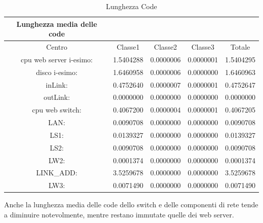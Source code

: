 \begin{table}[htbp]
\begin{center}
\begin{tabular}{|c|c|c|c|c|}
\hline
Lunghezza media delle code\\
\hline
Centro &Classe1 &Classe2 &Classe3 &Totale\\
\hline
\hline
 cpu web server i-esimo: 	&1.5404288	&0.0000006	&0.0000001	&1.5404295\\
\hline
 disco i-esimo: 	&1.6460958	&0.0000006	&0.0000000	&1.6460963\\
\hline
 inLink: 	&0.4752640	&0.0000007	&0.0000001	&0.4752647\\
\hline
 outLink: 	&0.0000000	&0.0000000	&0.0000000	&0.0000000\\
\hline
 cpu web switch: 	&0.4067200	&0.0000004	&0.0000001	&0.4067205\\
\hline
 LAN: 	&0.0090708	&0.0000000	&0.0000000	&0.0090708\\
\hline
 LS1: 	&0.0139327	&0.0000000	&0.0000000	&0.0139327\\
\hline
 LS2: 	&0.0090708	&0.0000000	&0.0000000	&0.0090708\\
\hline
 LW2: 	&0.0001374	&0.0000000	&0.0000000	&0.0001374\\
\hline
 LINK_ADD: 	&3.5259678	&0.0000000	&0.0000000	&3.5259678\\
\hline
 LW3: 	&0.0071490	&0.0000000	&0.0000000	&0.0071490\\
\hline
\end{tabular}
\end{center}
\caption{Lunghezza Code}
\label{lunghezzacode}
\end{table}
Anche la lunghezza media delle code dello switch e delle componenti di rete tende a diminuire notevolmente, mentre restano immutate quelle dei web server.
